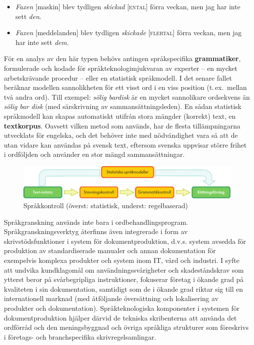 \begin{multicols}{2}
\begin{itemize}
\item \textit{Faxen} [maskin] blev tydligen \textit{skickad} [\textsc{ental}] förra veckan, men jag har inte sett \textit{den}.
\item \textit{Faxen} [meddelanden] blev tydligen \textit{skickade} [\textsc{flertal}] förra veckan, men jag har inte sett \textit{dem}.
\end{itemize}

För en analys av den här typen behövs antingen språkspecifika
\textbf{grammatiker}, formulerade och kodade för
språkteknologimjukvaran av experter -- en mycket arbetskrävande
procedur -- eller en statistisk språkmodell. I det senare fallet
beräknar modellen sannolikheten för ett visst ord i en viss position
(t.\,ex.~mellan två andra ord). Till exempel: \textit{sölig bardisk} är
en mycket sannolikare ordsekvens än \textit{sölig bar disk} (med
särskrivning av sammansättningsleden). En sådan statistisk språkmodell
kan skapas automatiskt utifrån stora mängder (korrekt) text, en
\textbf{textkorpus}. Oavsett vilken metod som används, har de flesta
tillämpningarna utvecklats för engelska, och det behöver inte med
nödvändighet vara så att de utan vidare kan användas på svensk text,
eftersom svenska uppvisar större frihet i ordföljden och använder en
stor mängd sammansättningar.


\begin{figure}[htb]
  \center
  \includegraphics[width=\textwidth]{../_media/swedish/language_checking}
  \caption{Språkkontroll (överst: statistisk, underst: regelbaserad)}
  \label{fig:langcheckingaarch_sv}
\end{figure}

Språkgranskning används inte bara i
ordbehandlingsprogram. Språkgranskningsverktyg återfinns även
integrerade i form av skrivstödsfunktioner i system för
dokumentproduktion, d.v.s. system avsedda för produktion av
standardiserade manualer och annan dokumentation för exempelvis
komplexa produkter och system inom IT, vård och industri. I syfte att
undvika kundklagomål om användningssvårigheter och skadeståndskrav som
ytterst beror på svårbegripliga instruktioner, fokuserar företag i
ökande grad på kvaliteten i sin dokumentation, samtidigt som de i
ökande grad riktar sig till en internationell marknad (med åtföljande
översättning och lokalisering av produkter och
dokumentation). Språkteknologiska komponenter i systemen för
dokumentproduktion hjälper därvid de tekniska skribenterna att använda
det ordförråd och den meningsbyggnad och övriga språkliga strukturer
som föreskrivs i företags- och branchspecifika skrivregelsamlingar.


\end{multicols}
